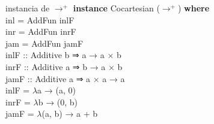 \documentclass{beamer}
\begin{document}
\begin{frame}{instancia de $\to^+$}
    \textbf{instance} Cocartesian ($\to^+$) \textbf{where}\\
        \hspace{1cm} inl = AddFun inlF\\
        \hspace{1cm} inr = AddFun inrF\\
        \hspace{1cm} jam = AddFun jamF\\
    \vspace{2mm} 
    inlF :: Additive b ⇒ a → a × b\\ 
    inrF :: Additive a ⇒ b → a × b\\
    jamF :: Additive a ⇒ a × a → a\\
    \vspace{2mm} 
    inlF = $\lambda$a → (a, 0)    \\ 
    inrF = $\lambda$b → (0, b)    \\
    jamF = $\lambda$(a, b) → a + b\\ 
\end{frame}
\end{document}
